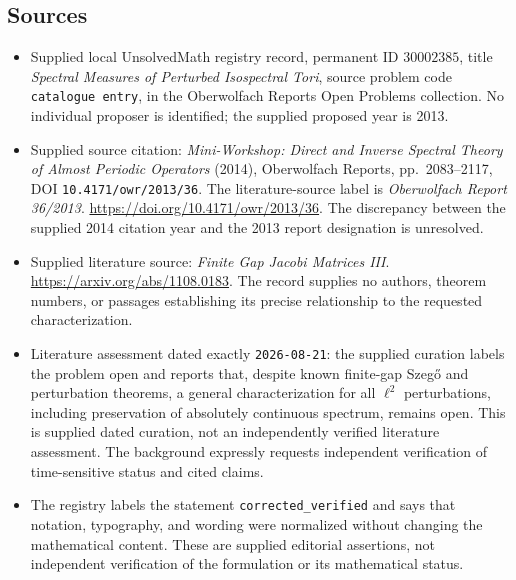 \documentclass[11pt]{article}
\begin{document}
\subsection{Sources}
\begin{itemize}
\item Supplied local UnsolvedMath registry record, permanent ID \(30002385\), title \emph{Spectral Measures of Perturbed Isospectral Tori}, source problem code \texttt{catalogue entry}, in the Oberwolfach Reports Open Problems collection. No individual proposer is identified; the supplied proposed year is 2013.
\item Supplied source citation: \emph{Mini-Workshop: Direct and Inverse Spectral Theory of Almost Periodic Operators} (2014), Oberwolfach Reports, pp.~2083--2117, DOI \texttt{10.4171/owr/2013/36}. The literature-source label is \emph{Oberwolfach Report 36/2013}. \url{https://doi.org/10.4171/owr/2013/36}. The discrepancy between the supplied 2014 citation year and the 2013 report designation is unresolved.
\item Supplied literature source: \emph{Finite Gap Jacobi Matrices III}. \url{https://arxiv.org/abs/1108.0183}. The record supplies no authors, theorem numbers, or passages establishing its precise relationship to the requested characterization.
\item Literature assessment dated exactly \texttt{2026-08-21}: the supplied curation labels the problem open and reports that, despite known finite-gap Szeg\H{o} and perturbation theorems, a general characterization for all \(\ell^2\) perturbations, including preservation of absolutely continuous spectrum, remains open. This is supplied dated curation, not an independently verified literature assessment. The background expressly requests independent verification of time-sensitive status and cited claims.
\item The registry labels the statement \texttt{corrected\_verified} and says that notation, typography, and wording were normalized without changing the mathematical content. These are supplied editorial assertions, not independent verification of the formulation or its mathematical status.
\end{itemize}
\end{document}
